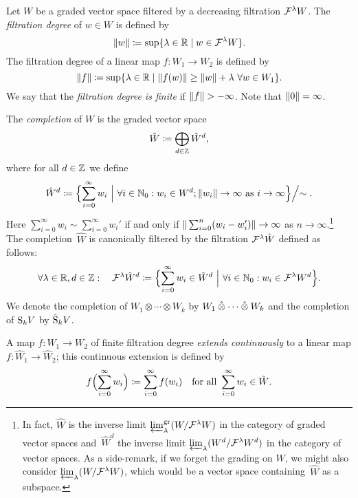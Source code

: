 \documentclass[\MainFolder/Text.tex]{subfiles}
\begin{document}
\begin{Definition}[Completions]\label{Def:Completion}
Let $W$ be a graded vector space filtered by a decreasing filtration $\mathcal{F}^\lambda W$. The \emph{filtration degree} of $w\in W$ is defined by
\[ \| w \| \coloneqq \sup\{ \lambda\in \mathbb{R} \mid w\in \mathcal{F}^\lambda W\}. \]
The filtration degree of a linear map $f: W_1 \rightarrow W_2$ is defined by
\[ \| f \| \coloneqq \sup \{ \lambda\in \mathbb{R} \mid \| f(w) \| \ge \| w \| + \lambda\ \forall w\in W_1\}. \]
We say that the \emph{filtration degree is finite} if $\Norm{f}>-\infty$. Note that $\| 0 \| = \infty$.

The \emph{completion} of $W$ is the graded vector space
\[ \hat{W}\coloneqq \bigoplus_{d\in \mathbb{Z}} \hat{W}^d, \]
where for all $d\in \mathbb{Z}$  we define
\[ \hat{W}^d \coloneqq \Bigl\{ \sum_{i=0}^\infty w_i\ \Bigl|\   \forall i\in \mathbb{N}_0: w_i\in W^d; \| w_i \| \to \infty \text{ as }i\to \infty \Bigl\}\Bigl/\sim.
\]
Here $\sum_{i=0}^\infty w_i \sim \sum_{i=0}^\infty w_i'$ if and only if $\| \sum_{i=0}^n (w_i - w_i') \|\to \infty$ as $n\to \infty$.\footnote{\label{Footnote:Compl}In fact, $\hat{W}$ is the inverse limit $\varprojlim_\lambda^{\mathrm{gr}}(W/\mathcal{F}^\lambda W)$ in the category of graded vector spaces and~$\hat{W}^d$ the inverse limit $\varprojlim_\lambda(W^d/\mathcal{F}^\lambda W^d)$ in the category of vector spaces. As a side-remark, if we forget the grading on $W$, we might also consider $\varprojlim_\lambda (W/\mathcal{F}^\lambda W)$, which would be a vector space containing~$\hat{W}$ as a subspace\vphantom{$W^d$}.}
The completion~$\hat{W}$ is canonically filtered by the filtration $\mathcal{F}^\lambda \hat{W}$ defined as follows:
\[ \forall \lambda\in \mathbb{R}, d\in \mathbb{Z}: \quad \mathcal{F}^\lambda\hat{W}^d\coloneqq \Bigl\{\sum_{i=0}^\infty w_i \in \hat{W}^d \ \Bigr|\ \forall i\in \mathbb{N}_0: w_i \in \mathcal{F}^\lambda W^d \Bigr\}. \]
We denote the completion of $W_1 \otimes \dotsb \otimes W_k$ by $W_1 \COtimes \dotsb \COtimes W_k$ and the completion of $\mathrm{S}_k V$ by $\hat{\mathrm{S}}_k V$. 


A map $f: W_1 \rightarrow W_2$ of finite filtration degree
\emph{extends continuously} to a linear map $f: \hat{W}_1 \rightarrow \hat{W}_2$; this continuous extension is defined by
\[ f\Bigl(\sum_{i=0}^\infty w_i\Bigr)\coloneqq \sum_{i=0}^\infty f(w_i)\quad\text{for all }\sum_{i=0}^\infty w_i \in \hat{W}. \]
\end{Definition}
\end{document}

